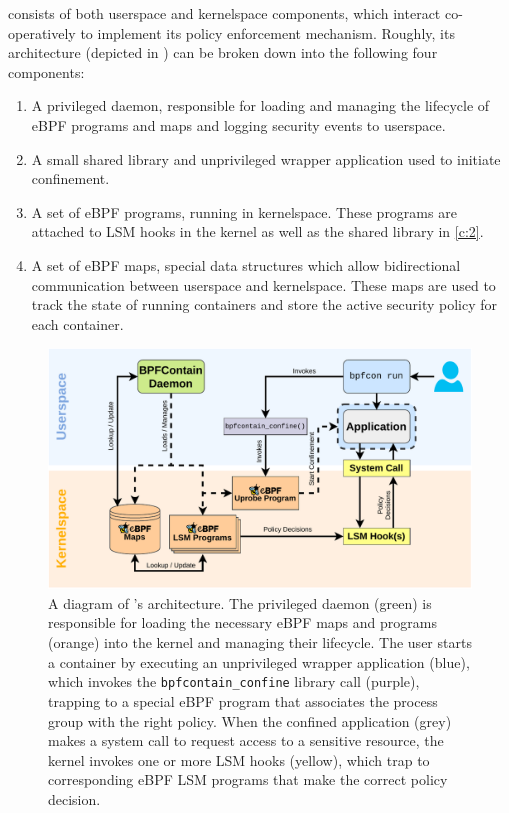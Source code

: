 \bpfcontain{} consists of both userspace and kernelspace components, which interact co-operatively to implement its policy enforcement mechanism. Roughly, its architecture (depicted in ) can be broken down into the following four components:
\begin{enumerate}[label=\bfseries C\arabic*., ref=C\arabic*, labelindent=1em]
  \item \label{c:1}
    A privileged daemon, responsible for loading and managing the lifecycle of eBPF programs and maps and logging security events to userspace.

  \item \label{c:2}
    A small shared library and unprivileged wrapper application used to initiate confinement.

  \item \label{c:3}
  A set of eBPF programs, running in kernelspace. These programs are attached to LSM hooks in the kernel as well as the shared library in \ref{c:2}.

  \item \label{c:4}
  A set of eBPF maps, special data structures which allow bidirectional communication between userspace and kernelspace. These maps are used to track the state of running containers and store the active security policy for each container.
\end{enumerate}

\begin{figure}[htb]
  \centering
  \includegraphics[width=0.8\linewidth]{figs/architecture.pdf}
  \caption{
    A diagram of \bpfcontain{}'s architecture. The privileged daemon (green) is responsible for loading the necessary eBPF maps and programs (orange) into the kernel and managing their lifecycle. The user starts a container by executing an unprivileged wrapper application (blue), which invokes the \texttt{bpfcontain\_confine} library call (purple), trapping to a special eBPF program that associates the process group with the right policy.  When the confined application (grey) makes a system call to request access to a sensitive resource, the kernel invokes one or more LSM hooks (yellow), which trap to corresponding eBPF LSM programs that make the correct policy decision.
  }%
  \label{fig:architecture}
\end{figure}

